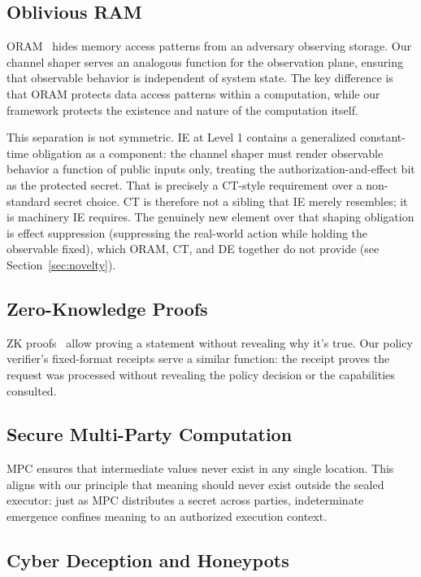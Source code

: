 \documentclass[11pt,a4paper]{article}
\begin{document}
\subsection{Oblivious RAM}

ORAM~\cite{goldreich1996software} hides memory access patterns from an adversary observing storage. Our channel shaper serves an analogous function for the observation plane, ensuring that observable behavior is independent of system state. The key difference is that ORAM protects data access patterns within a computation, while our framework protects the existence and nature of the computation itself.

This separation is not symmetric. IE at Level 1 contains a generalized constant-time obligation as a component: the channel shaper must render observable behavior a function of public inputs only, treating the authorization-and-effect bit as the protected secret. That is precisely a CT-style requirement over a non-standard secret choice. CT is therefore not a sibling that IE merely resembles; it is machinery IE requires. The genuinely new element over that shaping obligation is effect suppression (suppressing the real-world action while holding the observable fixed), which ORAM, CT, and DE together do not provide (see Section~\ref{sec:novelty}).

\subsection{Zero-Knowledge Proofs}

ZK proofs~\cite{goldwasser1985knowledge} allow proving a statement without revealing why it's true. Our policy verifier's fixed-format receipts serve a similar function: the receipt proves the request was processed without revealing the policy decision or the capabilities consulted.

\subsection{Secure Multi-Party Computation}

MPC ensures that intermediate values never exist in any single location. This aligns with our principle that meaning should never exist outside the sealed executor: just as MPC distributes a secret across parties, indeterminate emergence confines meaning to an authorized execution context.

\subsection{Cyber Deception and Honeypots}
\end{document}

